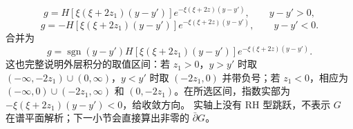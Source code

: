 \documentclass[lang=cn,scheme=chinese,mode=simple,device=normal,color=blue,math=cm,thmcnt=section,12pt]{elegantbook}
\newcommand{\eqq}[2]{\tag{#1}\label{eq:#1}#2}
\DeclareMathOperator{\sgn}{sgn}
\begin{document}
\begin{equation}
\eqq{7.5.16}{g=H[\xi(\xi+2z_1)(y-y')]e^{-\xi(\xi+2z)(y-y')},\qquad y-y'>0,}
\end{equation}
\begin{equation}
\eqq{7.5.17}{g=-H[\xi(\xi+2z_1)(y-y')]e^{-\xi(\xi+2z)(y-y')},\qquad y-y'<0.}
\end{equation}
合并为
\begin{equation}
\eqq{7.5.18}{g=\sgn(y-y')H[\xi(\xi+2z_1)(y-y')]e^{-\xi(\xi+2z)(y-y')}.}
\end{equation}
这也完整说明外层积分的取值区间：若 $z_1>0$，$y>y'$ 时取
$(-\infty,-2z_1)\cup(0,\infty)$，$y<y'$ 时取 $(-2z_1,0)$ 并带负号；若 $z_1<0$，相应为
$(-\infty,0)\cup(-2z_1,\infty)$ 和 $(0,-2z_1)$。在所选区间，指数实部为 $-\xi(\xi+2z_1)(y-y')<0$，给收敛方向。
实轴上没有 RH 型跳跃，不表示 $G$ 在谱平面解析；下一小节会直接算出非零的 $\bar\partial G$。
\end{document}

